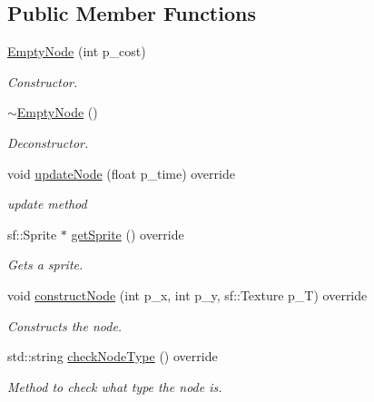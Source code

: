 \subsection*{Public Member Functions}
\begin{DoxyCompactItemize}
\item 
\mbox{\label{class_empty_node_a9e18fe1b046d001ca7b2daf87d2fd5bb}} 
\mbox{\hyperlink{class_empty_node_a9e18fe1b046d001ca7b2daf87d2fd5bb}{Empty\+Node}} (int p\+\_\+cost)
\begin{DoxyCompactList}\small\item\em Constructor. \end{DoxyCompactList}\item 
\mbox{\hyperlink{class_empty_node_aa8c8d6db9649c4ff5624be87953092d1}{$\sim$\+Empty\+Node}} ()
\begin{DoxyCompactList}\small\item\em Deconstructor. \end{DoxyCompactList}\item 
\mbox{\label{class_empty_node_ae11626adf3ad771cfcc68599c67ff354}} 
void \mbox{\hyperlink{class_empty_node_ae11626adf3ad771cfcc68599c67ff354}{update\+Node}} (float p\+\_\+time) override
\begin{DoxyCompactList}\small\item\em update method \end{DoxyCompactList}\item 
sf\+::\+Sprite $\ast$ \mbox{\hyperlink{class_empty_node_a1f449e50eefe1388f5b255a5dc027cc8}{get\+Sprite}} () override
\begin{DoxyCompactList}\small\item\em Gets a sprite. \end{DoxyCompactList}\item 
\mbox{\label{class_empty_node_a50183fa0423e94904facd89bd70062f4}} 
void \mbox{\hyperlink{class_empty_node_a50183fa0423e94904facd89bd70062f4}{construct\+Node}} (int p\+\_\+x, int p\+\_\+y, sf\+::\+Texture p\+\_\+T) override
\begin{DoxyCompactList}\small\item\em Constructs the node. \end{DoxyCompactList}\item 
std\+::string \mbox{\hyperlink{class_empty_node_a2281f852354a5b95ba06f4e2a7e8de34}{check\+Node\+Type}} () override
\begin{DoxyCompactList}\small\item\em Method to check what type the node is. \end{DoxyCompactList}\end{DoxyCompactItemize}
